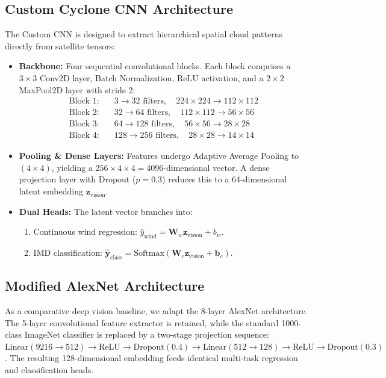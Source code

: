 \documentclass[conference]{IEEEtran}
\begin{document}
\subsection{Custom Cyclone CNN Architecture}
The Custom CNN is designed to extract hierarchical spatial cloud patterns directly from satellite tensors:
\begin{itemize}
    \item \textbf{Backbone:} Four sequential convolutional blocks. Each block comprises a $3 \times 3$ Conv2D layer, Batch Normalization, ReLU activation, and a $2 \times 2$ MaxPool2D layer with stride 2:
    \begin{align*}
        \text{Block 1:} & \quad 3 \to 32 \text{ filters}, \quad 224 \times 224 \to 112 \times 112 \\
        \text{Block 2:} & \quad 32 \to 64 \text{ filters}, \quad 112 \times 112 \to 56 \times 56 \\
        \text{Block 3:} & \quad 64 \to 128 \text{ filters}, \quad 56 \times 56 \to 28 \times 28 \\
        \text{Block 4:} & \quad 128 \to 256 \text{ filters}, \quad 28 \times 28 \to 14 \times 14
    \end{align*}
    \item \textbf{Pooling \& Dense Layers:} Features undergo Adaptive Average Pooling to $(4 \times 4)$, yielding a $256 \times 4 \times 4 = 4096$-dimensional vector. A dense projection layer with Dropout ($p = 0.3$) reduces this to a 64-dimensional latent embedding $\mathbf{z}_{\text{vision}}$.
    \item \textbf{Dual Heads:} The latent vector branches into:
    \begin{enumerate}
        \item Continuous wind regression: $\hat{y}_{\text{wind}} = \mathbf{W}_w \mathbf{z}_{\text{vision}} + b_w$.
        \item IMD classification: $\hat{\mathbf{y}}_{\text{class}} = \text{Softmax}(\mathbf{W}_c \mathbf{z}_{\text{vision}} + \mathbf{b}_c)$.
    \end{enumerate}
\end{itemize}

\subsection{Modified AlexNet Architecture}
As a comparative deep vision baseline, we adapt the 8-layer AlexNet architecture. The 5-layer convolutional feature extractor is retained, while the standard 1000-class ImageNet classifier is replaced by a two-stage projection sequence: $\text{Linear}(9216 \to 512) \to \text{ReLU} \to \text{Dropout}(0.4) \to \text{Linear}(512 \to 128) \to \text{ReLU} \to \text{Dropout}(0.3)$. The resulting 128-dimensional embedding feeds identical multi-task regression and classification heads.
\end{document}
